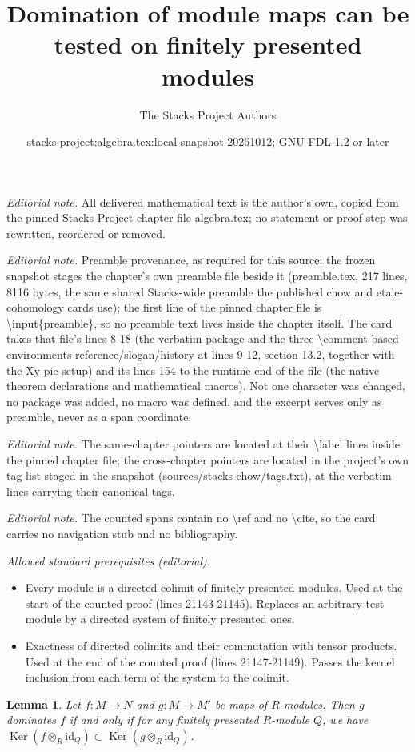 \documentclass[10pt,a4paper]{amsart}
\title{Domination of module maps can be tested on finitely presented modules}
\author{The Stacks Project Authors}
\date{stacks-project:algebra.tex:local-snapshot-20261012; GNU FDL 1.2 or later}
\theoremstyle{plain}
\newtheorem{lemma}[subsection]{Lemma}
\theoremstyle{definition}
\theoremstyle{remark}
\numberwithin{equation}{subsection}
\def\Ker{\mathop{\mathrm{Ker}}}
\begin{document}
\maketitle
\noindent\textit{Editorial note.} All delivered mathematical text is the author's own, copied from the pinned Stacks Project chapter file algebra.tex; no statement or proof step was rewritten, reordered or removed.\par\medskip
\noindent\textit{Editorial note.} Preamble provenance, as required for this source: the frozen snapshot stages the chapter's own preamble file beside it (preamble.tex, 217 lines, 8116 bytes, the same shared Stacks-wide preamble the published chow and etale-cohomology cards use); the first line of the pinned chapter file is \textbackslash{}input\{preamble\}, so no preamble text lives inside the chapter itself. The card takes that file's lines 8-18 (the verbatim package and the three \textbackslash{}comment-based environments reference/slogan/history at lines 9-12, section 13.2, together with the Xy-pic setup) and its lines 154 to the runtime end of the file (the native theorem declarations and mathematical macros). Not one character was changed, no package was added, no macro was defined, and the excerpt serves only as preamble, never as a span coordinate.\par\medskip
\noindent\textit{Editorial note.} The same-chapter pointers are located at their \textbackslash{}label lines inside the pinned chapter file; the cross-chapter pointers are located in the project's own tag list staged in the snapshot (sources/stacks-chow/tags.txt), at the verbatim lines carrying their canonical tags.\par\medskip
\noindent\textit{Editorial note.} The counted spans contain no \textbackslash{}ref and no \textbackslash{}cite, so the card carries no navigation stub and no bibliography.\par\medskip
\noindent\textit{Allowed standard prerequisites (editorial).}\begin{itemize}
\item Every module is a directed colimit of finitely presented modules. Used at the start of the counted proof (lines 21143-21145). Replaces an arbitrary test module by a directed system of finitely presented ones.
\item Exactness of directed colimits and their commutation with tensor products. Used at the end of the counted proof (lines 21147-21149). Passes the kernel inclusion from each term of the system to the colimit.
\end{itemize}\medskip
\begin{lemma}
\label{lemma-domination-fp}
Let $f: M \to N$ and $g: M \to M'$ be maps of $R$-modules.
Then $g$ dominates $f$ if and only if for any finitely presented $R$-module
$Q$, we have $\Ker(f \otimes_R \text{id}_Q) \subset \Ker(g \otimes_R
\text{id}_Q)$.
\end{lemma}
\end{document}
